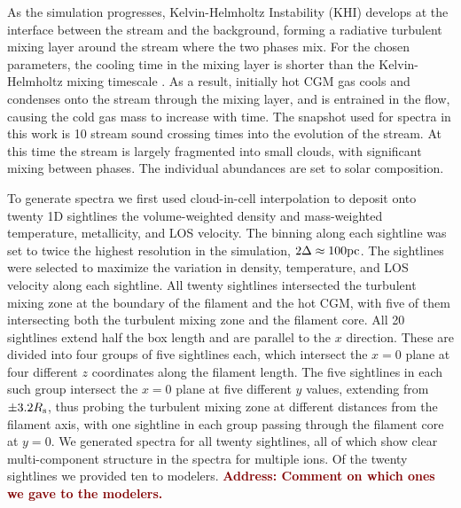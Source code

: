 \documentclass[fleqn,usenatbib]{mnras}
\newcommand{\todo}[1]{\textcolor{Maroon}{\textbf{Address: #1}}}
\begin{document}
As the simulation progresses, Kelvin-Helmholtz Instability (KHI) develops at the interface between the stream and the background, forming a radiative turbulent mixing layer around the stream where the two phases mix.
For the chosen parameters, the cooling time in the mixing layer is shorter than the Kelvin-Helmholtz mixing timescale \citep{Mandelker2020a}.
As a result, initially hot CGM gas cools and condenses onto the stream through the mixing layer, and is entrained in the flow, causing the cold gas mass to increase with time.
The snapshot used for spectra in this work is 10 stream sound crossing times into the evolution of the stream.
At this time the stream is largely fragmented into small clouds, with significant mixing between phases.
The individual abundances are set to solar composition.

To generate spectra we first used cloud-in-cell interpolation to deposit onto twenty 1D sightlines the volume-weighted density and mass-weighted temperature, metallicity, and LOS velocity.
The binning along each sightline was set to twice the highest resolution in the simulation, $2\Delta \approx 100{\rm pc}$.
The sightlines were selected to maximize the variation in density, temperature, and LOS velocity along each sightline.
All twenty sightlines intersected the turbulent mixing zone at the boundary of the filament and the hot CGM, with five of them intersecting both the turbulent mixing zone and the filament core.
All 20 sightlines extend half the box length and are parallel to the $x$ direction.
These are divided into four groups of five sightlines each, which intersect the $x=0$ plane at four different $z$ coordinates along the filament length.
The five sightlines in each such group intersect the $x=0$ plane at five different $y$ values, extending from $\pm 3.2R_{\rm s}$, thus probing the turbulent mixing zone at different distances from the filament axis, with one sightline in each group passing through the filament core at $y=0$.
We generated spectra for all twenty sightlines, all of which show clear multi-component structure in the spectra for multiple ions.
Of the twenty sightlines we provided ten to modelers.
\todo{Comment on which ones we gave to the modelers.}
\end{document}
